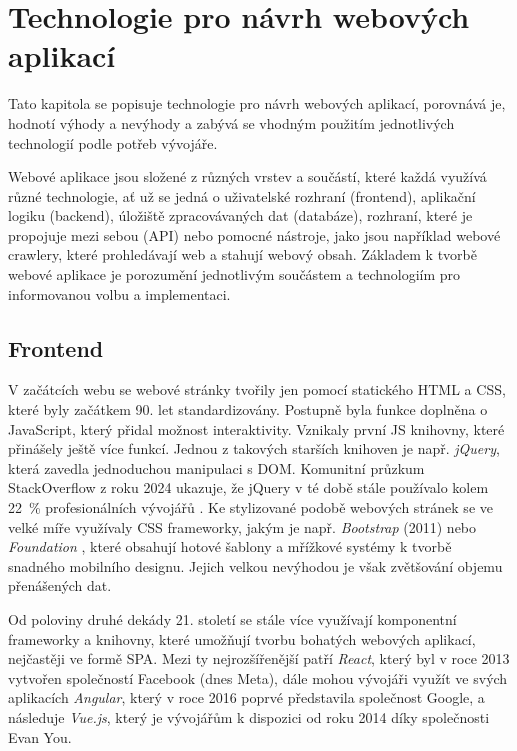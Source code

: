 \chapter{Technologie pro návrh webových aplikací}
\label{ch:initial-research}

Tato kapitola se popisuje technologie pro návrh webových aplikací, 
porovnává je, hodnotí výhody a nevýhody a zabývá se vhodným použitím
jednotlivých technologií podle potřeb vývojáře.

Webové aplikace jsou složené z různých vrstev a součástí, které každá
využívá různé technologie, ať už se jedná o uživatelské rozhraní (frontend),
aplikační logiku (backend), úložiště zpracovávaných dat (databáze),
rozhraní, které je propojuje mezi sebou (API) nebo pomocné nástroje,
jako jsou například webové crawlery, které prohledávají web a stahují
webový obsah. Základem k tvorbě webové aplikace je porozumění jednotlivým
součástem a technologiím pro informovanou volbu a implementaci.
\cite{YHVfLHsNlUItkF6G} %

\section{Frontend}
\label{sec:research-frontend}

V začátcích webu se webové stránky tvořily jen pomocí statického HTML a CSS,
které byly začátkem 90. let standardizovány. Postupně byla funkce doplněna
o JavaScript, který přidal možnost interaktivity. Vznikaly první JS knihovny,
které přinášely ještě více funkcí. Jednou z takových starších knihoven
je např. \emph{jQuery}, která zavedla jednoduchou manipulaci s DOM.
Komunitní průzkum StackOverflow z roku 2024 ukazuje, že jQuery v té době
stále používalo kolem 22~\% profesionálních vývojářů
\cite{YHVfLHsNlUItkF6G,w6F4OYb0neliWLGP}. %
Ke stylizované podobě webových stránek se ve velké míře využívaly CSS
frameworky, jakým je např. \emph{Bootstrap} (2011) nebo \emph{Foundation}
\cite{YHVfLHsNlUItkF6G,Nsz2b52zS5s0JglP}, %
které obsahují hotové šablony a mřížkové systémy k tvorbě snadného mobilního
designu. Jejich velkou nevýhodou je však zvětšování objemu přenášených dat.

Od poloviny druhé dekády 21. století se stále více využívají komponentní
frameworky a knihovny, které umožňují tvorbu bohatých webových aplikací,
nejčastěji ve formě SPA. Mezi ty nejrozšířenější patří \emph{React},
který byl v roce 2013 vytvořen společností Facebook (dnes Meta), dále
mohou vývojáři využít ve svých aplikacích \emph{Angular}, který v roce
2016 poprvé představila společnost Google, a následuje \emph{Vue.js},
který je vývojářům k dispozici od roku 2014 díky společnosti Evan You.
\cite{YHVfLHsNlUItkF6G,1WL9hIh67tHjtVTy} %

